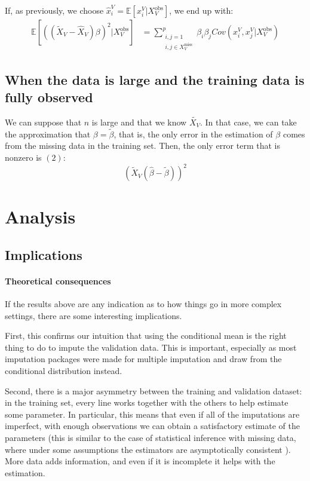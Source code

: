  If, as previously, we choose $\hat{x}^V_i = \mathbb{E}[x^V_i \vert X_V^{\text{obs}}]$, we end up with:
 \begin{align*}
 \mathbb{E}[((\tilde{X}_V - \hat{X}_V)\beta)^2 \vert X_V^{\text{obs}}] &= 
 	\sum \limits_{\substack{i,j=1 \\i,j \in X_V^{\text{miss}}}}^{p} \beta_i \beta_j Cov(x^V_i, x^V_j \vert X_V^{\text{obs}})
 \end{align*}

		\subsection{When the data is large and the training data is fully observed}
We can suppose that $n$ is large and that we know $\tilde{X_V}$. In that case, we can take the approximation that $\beta = \tilde{\beta}$, that is, the only error in the estimation of $\beta$ comes from the missing data in the training set. Then, the only error term that is nonzero is $(2)$:
$$ (\tilde{X}_V (\hat{\beta} - \tilde{\beta}))^2$$
	\section{Analysis}
		\subsection{Implications}
\paragraph{Theoretical consequences}
If the results above are any indication as to how things go in more complex settings, there are some interesting implications. 

First, this confirms our intuition that using the conditional mean is the right thing to do to impute the validation data. This is important, especially as most imputation packages were made for multiple imputation and draw from the conditional distribution instead.

Second, there is a major asymmetry between the training and validation dataset: in the training set, every line works together with the others to help estimate some parameter. In particular, this means that even if all of the imputations are imperfect, with enough observations we can obtain a satisfactory estimate of the parameters (this is similar to the case of statistical inference with missing data, where under some assumptions the estimators are asymptotically consistent \cite{rubin_ignorability}). More data adds information, and even if it is incomplete it helps with the estimation.


